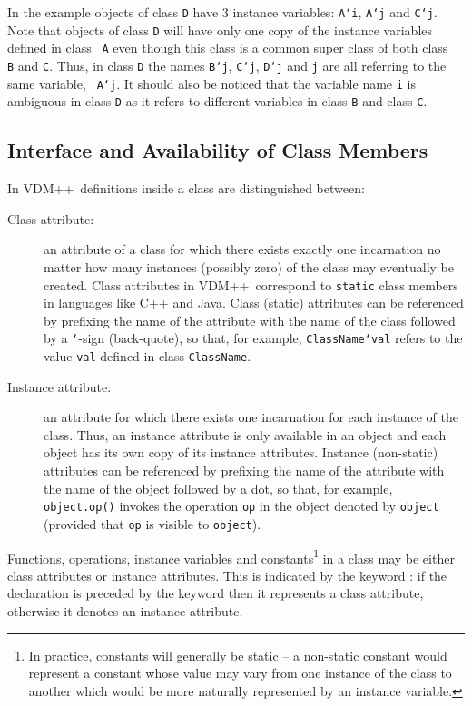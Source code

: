 \documentclass[\pformat,12pt]{article}
\newcommand{\vdmpp}{VDM++}
\newcommand{\vppsmall}{\small\tt}
\begin{document}
In the example objects of class {\tt D} have 3 instance variables:
{\tt A`i}, {\tt A`j} and {\tt C`j}. Note that objects of class {\tt D}
will have only one copy of the instance variables defined in class {\tt
A} even though this class is a common super class of both class {\tt
B} and {\tt C}. Thus, in class {\tt D} the names {\tt B`j}, {\tt C`j},
{\tt D`j} and {\tt j} are all referring to the same variable, {\tt
A`j}. It should also be noticed that the variable name {\tt i} is
ambiguous in class {\tt D} as it refers to different variables in
class {\tt B} and class {\tt C}.

\subsection{Interface and Availability of Class Members}\label{ch:interface}

In \vdmpp\ definitions inside a class are distinguished between:

\begin{description}
\item[Class attribute:] an attribute of a class for which there
  exists exactly one incarnation no matter how many instances
  (possibly zero) of the class may eventually be created. Class
  attributes in \vdmpp\ correspond to {\tt static} class members in
  languages like C++ and Java. Class (static) attributes can be
  referenced by prefixing the name of the attribute with the name of
  the class followed by a {\vppsmall `}-sign (back-quote), so that, for
  example, {\tt ClassName`val} refers to the value {\tt val} defined in
  class {\tt ClassName}.

\item[Instance attribute:] an attribute for which there exists one
  incarnation for each instance of the class. Thus, an instance
  attribute is only available in an object and each object has its own
  copy of its instance attributes. Instance (non-static) attributes
  can be referenced by prefixing the name of the attribute with the name of
  the object followed by a dot, so that, for example, {\tt
    object.op()} invokes the operation {\tt op} in the object denoted
  by {\tt object} (provided that \texttt{op} is visible to
  \texttt{object}).
\end{description}

Functions, operations, instance variables and constants\footnote{In
  practice, constants will generally be static -- a non-static
  constant would represent a constant whose value may vary from one
  instance of the class to another which would be more naturally
  represented by an instance variable.} in a class may 
be either class attributes or instance attributes. This is indicated
by the keyword : if the declaration is preceded by the
keyword  then it represents a class attribute, otherwise
it denotes an instance attribute. 
\end{document}
